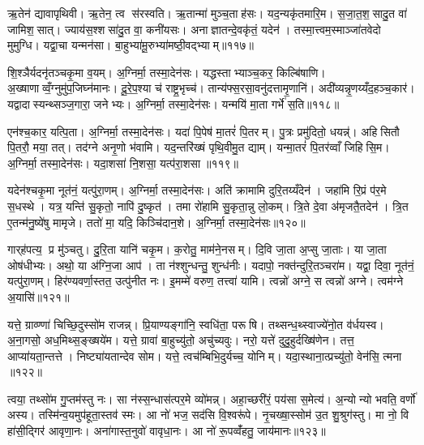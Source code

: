 ऋ॒तेन॑ द्यावापृथिवी। ऋ॒तेन॒ त्व स॑रस्वति। ऋ॒तान्मा॑ मुञ्च॒ताह॑सः। यद॒न्यकृ॑तमारि॒म। स॒जा॒त॒श॒सादु॒त वा॑ जामिश॒सात्। ज्याय॑स॒श्शसा॑दु॒त वा॒ कनी॑यसः। अनाज्ञातन्दे॒वकृ॑तं॒ यदेन॑। तस्मा॒त्त्वम॒स्माञ्जा॑तवेदो मुमुग्धि। यद्वा॒चा यन्मन॑सा। बा॒हुभ्या॑मू॒रुभ्या॑मष्ठी॒वद्भ्याम्॥११७॥

शि॒श्ञैर्यदनृ॑तञ्चकृ॒मा व॒यम्। अ॒ग्निर्मा॒ तस्मा॒देन॑सः। यद्धस्ताभ्याञ्च॒कर॒ किल्बि॑षाणि। अ॒ख्षाणाव्वँ॒ग्नुमु॑प॒जिघ्न॑मानः। दू॒रे॒प॒श्या च॑ राष्ट्र॒भृच्च॑। तान्य॑फ्स॒रसा॒वनु॑दत्तामृ॒णानि॑। अदी॑व्यन्नृ॒णय्यँद॒हञ्च॒कार॑। यद्वादास्यन्थ्सञ्ज॒गारा॒ जनेभ्यः। अ॒ग्निर्मा॒ तस्मा॒देन॑सः। यन्मयि॑ मा॒ता गर्भे॑ स॒ति॥११८॥

एन॑श्च॒कार॒ यत्पि॒ता। अ॒ग्निर्मा॒ तस्मा॒देन॑सः। यदा॑ पि॒पेष॑ मा॒तरं॑ पि॒तरम्। पु॒त्रः प्रमु॑दितो॒ धयन्न्॑। अहिसितौ पि॒तरौ॒ मया॒ तत्। तद॑ग्ने अनृ॒णो भ॑वामि। यद॒न्तरि॑ख्षं पृथि॒वीमु॒त द्याम्। यन्मा॒तरं॑ पि॒तर॑व्वाँ जिहिसि॒म। अ॒ग्निर्मा॒ तस्मा॒देन॑सः। यदा॒शसा॑ नि॒शसा॒ यत्प॑रा॒शसा॥११९॥

यदेन॑श्चकृ॒मा नूत॑नं॒ यत्पु॑रा॒णम्। अ॒ग्निर्मा॒ तस्मा॒देन॑सः। अति॑ क्रामामि दुरि॒तय्यँदेन॑। जहा॑मि रि॒प्रं प॑र॒मे स॒धस्थे। यत्र॒ यन्ति॑ सु॒कृतो॒ नापि॑ दु॒ष्कृत॑। तमा रो॑हामि सु॒कृता॒न्नु लो॒कम्। त्रि॒ते दे॒वा अ॑मृजतै॒तदेन॑। त्रि॒त ए॒तन्म॑नु॒ष्ये॑षु मामृजे। ततो॑ मा॒ यदि॒ किञ्चि॑दान॒शे। अ॒ग्निर्मा॒ तस्मा॒देन॑सः॥१२०॥

गार्‌ह॑पत्य॒ प्र मु॑ञ्चतु। दु॒रि॒ता यानि॑ चकृ॒म। क॒रोतु॒ माम॑ने॒नसम्। दि॒वि जा॒ता अ॒प्सु जा॒ताः। या जा॒ता ओष॑धीभ्यः। अथो॒ या अ॑ग्नि॒जा आप॑। ता न॑श्शुन्धन्तु॒ शुन्ध॑नीः। यदापो॒ नक्त॑न्दुरि॒तञ्चरा॑म। यद्वा॒ दिवा॒ नूत॑नं॒ यत्पु॑रा॒णम्। हिर॑ण्यवर्णा॒स्तत॒ उत्पु॑नीत नः। इ॒मम्मे॑ वरुण॒ तत्त्वा॑ यामि। त्वन्नो॑ अग्ने॒ स त्वन्नो॑ अग्ने। त्वम॑ग्ने अ॒यासि॑॥१२१॥\anuvakamend[अ॒ने॒नस॑मष्ठी॒वद्भ्या स॒ति प॑रा॒शसा॑ऽऽन॒शेऽग्निर्मा॒ तस्मा॒देन॑सः पुनीत न॒स्त्रीणि॑ च (यद्दे॑वा॒ देवा॑ ऋ॒तेन॑ सजातश॒साद्यद्वा॒चा यद्धस्ताभ्या॒मदीव्यं॒ यन्मयि॑ मा॒ता यदा॑ पि॒पेष॒ यद॒न्तरि॑ख्षं॒ यदा॒शसाऽति॑ क्रामामि त्रि॒ते दे॒वा दि॒वि जा॒ता अ॒प्सु जा॒ता यदाप॑ इ॒मम्मे॑ वरुण॒ तत्त्वा॑ यामि॒ त्वन्नो॑ अग्ने॒ स त्वन्नो॑ अग्ने॒ त्वम॑ग्ने अ॒यासि॑। )]

यत्ते॒ ग्राव्ण्णा॑ चिच्छि॒दुस्सो॑म राजन्न्। प्रि॒याण्यङ्गा॑नि॒ स्वधि॑ता॒ परूषि। तथ्सन्ध॒थ्स्वाज्ये॑नो॒त व॑र्धयस्व। अ॒ना॒गसो॒ अध॒मिथ्स॒ङ्ख्षये॑म। यत्ते॒ ग्रावा॑ बा॒हुच्यु॑तो॒ अचु॑च्यवुः। नरो॒ यत्ते॑ दुदु॒हुर्दख्षि॑णेन। तत्त॒ आप्या॑यता॒न्तत्ते। निष्ट्या॑यतान्देव सोम। यत्ते॒ त्वच॑म्बिभि॒दुर्यच्च॒ योनिम्। यदा॒स्थाना॒त्प्रच्यु॑तो॒ वेन॑सि॒ त्मना ॥१२२॥

त्वया॒ तथ्सो॑म गु॒प्तम॑स्तु नः। सा न॑स्स॒न्धास॑त्पर॒मे व्यो॑मन्न्। अहा॒च्छरी॑रं॒ पय॑सा स॒मेत्य॑। अ॒न्योन्यो भवति॒ वर्णो॑ अस्य। तस्मि॑न्व॒यमुप॑हूता॒स्तव॑ स्मः। आ नो॑ भज॒ सद॑सि वि॒श्वरू॑पे। नृ॒चख्षा॒स्सोम॑ उ॒त शु॒श्रुग॑स्तु। मा नो॒ वि हा॑सी॒द्गिर॑ आवृणा॒नः। अना॑गास्त॒नुवो॑ वावृधा॒नः। आ नो॑ रू॒पव्वँ॑हतु॒ जाय॑मानः॥१२३॥


